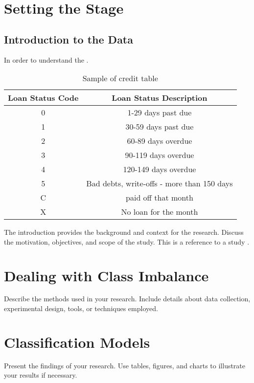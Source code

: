 \documentclass[12pt]{article}
\begin{document}
\section{Setting the Stage}
\subsection{Introduction to the Data}
In order to understand the .

\begin{table}[h!]
    \centering
    \begin{tabular}{|c|c|}
    \hline
    \textbf{Loan Status Code} & \textbf{Loan Status Description} \\ \hline
    0 & 1-29 days past due \\ \hline
    1 & 30-59 days past due \\ \hline
    2 & 60-89 days overdue \\ \hline
    3 & 90-119 days overdue \\ \hline
    4 & 120-149 days overdue \\ \hline
    5 & Bad debts, write-offs - more than 150 days \\ \hline
    C & paid off that month\\ \hline
    X & No loan for the month\\ \hline
    \end{tabular}
    \caption{Sample of credit table}
    \label{tab:simple_table}
\end{table}

The introduction provides the background and context for the research. Discuss the motivation, objectives, and scope of the study.
This is a reference to a study \cite{website2023}.

\section{Dealing with Class Imbalance}
Describe the methods used in your research. Include details about data collection, experimental design, tools, or techniques employed.

\section{Classification Models}
Present the findings of your research. Use tables, figures, and charts to illustrate your results if necessary.
\end{document}
